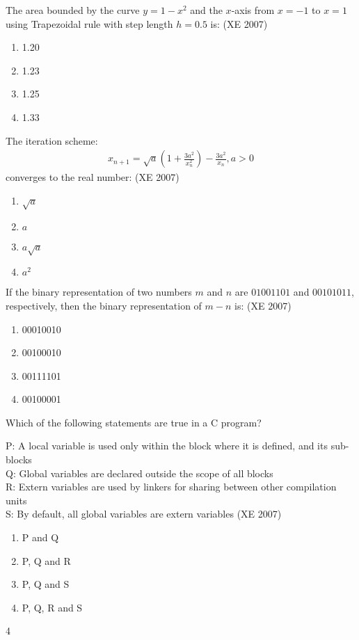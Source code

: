 \item The area bounded by the curve $y = 1 - x^2$ and the $x$-axis from $x = -1$ to $x = 1$ using Trapezoidal rule with step length $h = 0.5$ is:
 \hfill{(XE 2007)}
    \begin{multicols}{4}
    \begin{enumerate}
        \item 1.20
        \item 1.23
        \item 1.25
        \item 1.33
    \end{enumerate}
\end{multicols}
 \item The iteration scheme:
    \begin{align}
    x_{n+1} = \sqrt{a} \left( 1 + \frac{3a^2}{x_n^2} \right) - \frac{3a^2}{x_n} , a > 0
    \end{align}
    converges to the real number:
 \hfill{(XE 2007)}
    \begin{multicols}{4}
    \begin{enumerate}
        \item $\sqrt{a}$
        \item $a$
        \item $a\sqrt{a}$
        \item $a^2$
    \end{enumerate}
\end{multicols}
 \item If the binary representation of two numbers $m$ and $n$ are $01001101$ and $00101011$, respectively, then the binary representation of $m - n$ is:
 \hfill{(XE 2007)}
    \begin{multicols}{4}
    \begin{enumerate}
        \item 00010010
        \item 00100010
        \item 00111101
        \item 00100001
    \end{enumerate}
\end{multicols}
    \item Which of the following statements are true in a C program?
    
         P: A local variable is used only within the block where it is defined, and its sub-blocks\\
         Q: Global variables are declared outside the scope of all blocks\\
         R: Extern variables are used by linkers for sharing between other compilation units\\
         S: By default, all global variables are extern variables
 \hfill{(XE 2007)}
    \begin{multicols}{4}
    \begin{enumerate}
        \item P and Q
        \item P, Q and R
        \item P, Q and S
        \item P, Q, R and S
    \end{enumerate}
    \end{multicols}{4}

